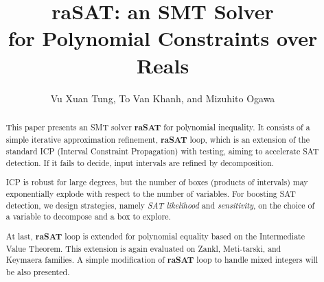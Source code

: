 \documentclass[runningheads,a4paper,oribibl]{llncs}
\begin{document}
%
\title{raSAT: an SMT Solver \\ for Polynomial Constraints over Reals}

\author{Vu Xuan Tung, To Van Khanh, and Mizuhito Ogawa} 


\maketitle

\begin{abstract}
This paper presents an SMT %
solver {\bf raSAT} for polynomial inequality. 
It consists of a simple iterative approximation refinement, {\bf raSAT} loop, 
which is an extension of the standard ICP (Interval Constraint Propagation) with testing, 
aiming to accelerate SAT detection. 
If it fails to decide, input intervals are refined by decomposition. 

ICP is robust for large degrees, but the number of boxes (products of intervals) 
may exponentially explode with respect to the number of variables. 
For boosting SAT detection, we design strategies, namely {\em SAT likelihood} and {\em sensitivity}, on the choice of a variable to decompose
and a box to explore. 

At last, {\bf raSAT} loop is extended for polynomial equality based on the Intermediate Value Theorem. 
This extension is again evaluated on Zankl, Meti-tarski, and Keymaera families.
A simple modification of \textbf{raSAT} loop to handle mixed integers will be also presented. 
\end{abstract}


%
\end{document}
